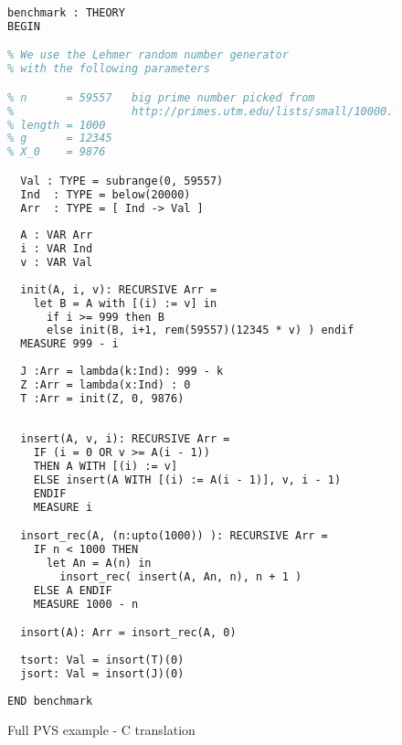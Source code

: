 \documentclass[12pt,a4paper]{article}
\begin{document}
\newpage
\begin{figure}
\begin{lstlisting}[language=TeX]
benchmark : THEORY
BEGIN

% We use the Lehmer random number generator
% with the following parameters

% n      = 59557   big prime number picked from
%                  http://primes.utm.edu/lists/small/10000.txt
% length = 1000
% g      = 12345
% X_0    = 9876

  Val : TYPE = subrange(0, 59557)
  Ind  : TYPE = below(20000)
  Arr  : TYPE = [ Ind -> Val ]
  
  A : VAR Arr
  i : VAR Ind
  v : VAR Val
  
  init(A, i, v): RECURSIVE Arr =
    let B = A with [(i) := v] in
      if i >= 999 then B	
      else init(B, i+1, rem(59557)(12345 * v) ) endif
  MEASURE 999 - i
  
  J :Arr = lambda(k:Ind): 999 - k
  Z :Arr = lambda(x:Ind) : 0
  T :Arr = init(Z, 0, 9876)
  
  
  insert(A, v, i): RECURSIVE Arr =
    IF (i = 0 OR v >= A(i - 1))
    THEN A WITH [(i) := v]
    ELSE insert(A WITH [(i) := A(i - 1)], v, i - 1)
    ENDIF
    MEASURE i

  insort_rec(A, (n:upto(1000)) ): RECURSIVE Arr =
    IF n < 1000 THEN
      let An = A(n) in
        insort_rec( insert(A, An, n), n + 1 )
    ELSE A ENDIF
    MEASURE 1000 - n

  insort(A): Arr = insort_rec(A, 0)
  
  tsort: Val = insort(T)(0)
  jsort: Val = insort(J)(0)
  
END benchmark
\end{lstlisting}
\caption{Full PVS example - C translation}
\end{figure}
\end{document}
